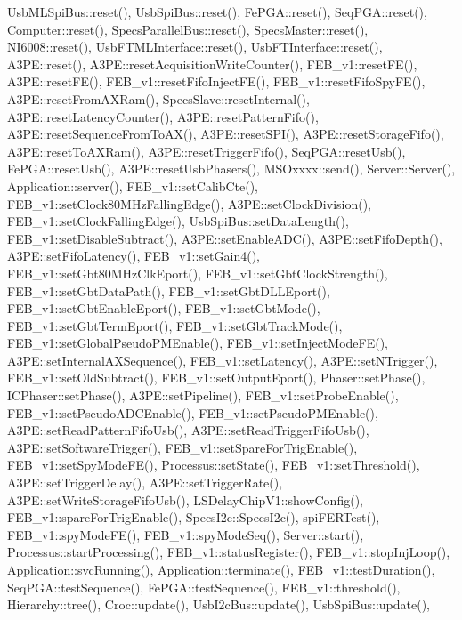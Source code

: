 Usb\+M\+L\+Spi\+Bus\+::reset(), Usb\+Spi\+Bus\+::reset(), Fe\+P\+G\+A\+::reset(), Seq\+P\+G\+A\+::reset(), Computer\+::reset(), Specs\+Parallel\+Bus\+::reset(), Specs\+Master\+::reset(), N\+I6008\+::reset(), Usb\+F\+T\+M\+L\+Interface\+::reset(), Usb\+F\+T\+Interface\+::reset(), A3\+P\+E\+::reset(), A3\+P\+E\+::reset\+Acquisition\+Write\+Counter(), F\+E\+B\+\_\+v1\+::reset\+F\+E(), A3\+P\+E\+::reset\+F\+E(), F\+E\+B\+\_\+v1\+::reset\+Fifo\+Inject\+F\+E(), F\+E\+B\+\_\+v1\+::reset\+Fifo\+Spy\+F\+E(), A3\+P\+E\+::reset\+From\+A\+X\+Ram(), Specs\+Slave\+::reset\+Internal(), A3\+P\+E\+::reset\+Latency\+Counter(), A3\+P\+E\+::reset\+Pattern\+Fifo(), A3\+P\+E\+::reset\+Sequence\+From\+To\+A\+X(), A3\+P\+E\+::reset\+S\+P\+I(), A3\+P\+E\+::reset\+Storage\+Fifo(), A3\+P\+E\+::reset\+To\+A\+X\+Ram(), A3\+P\+E\+::reset\+Trigger\+Fifo(), Seq\+P\+G\+A\+::reset\+Usb(), Fe\+P\+G\+A\+::reset\+Usb(), A3\+P\+E\+::reset\+Usb\+Phasers(), M\+S\+Oxxxx\+::send(), Server\+::\+Server(), Application\+::server(), F\+E\+B\+\_\+v1\+::set\+Calib\+Cte(), F\+E\+B\+\_\+v1\+::set\+Clock80\+M\+Hz\+Falling\+Edge(), A3\+P\+E\+::set\+Clock\+Division(), F\+E\+B\+\_\+v1\+::set\+Clock\+Falling\+Edge(), Usb\+Spi\+Bus\+::set\+Data\+Length(), F\+E\+B\+\_\+v1\+::set\+Disable\+Subtract(), A3\+P\+E\+::set\+Enable\+A\+D\+C(), A3\+P\+E\+::set\+Fifo\+Depth(), A3\+P\+E\+::set\+Fifo\+Latency(), F\+E\+B\+\_\+v1\+::set\+Gain4(), F\+E\+B\+\_\+v1\+::set\+Gbt80\+M\+Hz\+Clk\+Eport(), F\+E\+B\+\_\+v1\+::set\+Gbt\+Clock\+Strength(), F\+E\+B\+\_\+v1\+::set\+Gbt\+Data\+Path(), F\+E\+B\+\_\+v1\+::set\+Gbt\+D\+L\+L\+Eport(), F\+E\+B\+\_\+v1\+::set\+Gbt\+Enable\+Eport(), F\+E\+B\+\_\+v1\+::set\+Gbt\+Mode(), F\+E\+B\+\_\+v1\+::set\+Gbt\+Term\+Eport(), F\+E\+B\+\_\+v1\+::set\+Gbt\+Track\+Mode(), F\+E\+B\+\_\+v1\+::set\+Global\+Pseudo\+P\+M\+Enable(), F\+E\+B\+\_\+v1\+::set\+Inject\+Mode\+F\+E(), A3\+P\+E\+::set\+Internal\+A\+X\+Sequence(), F\+E\+B\+\_\+v1\+::set\+Latency(), A3\+P\+E\+::set\+N\+Trigger(), F\+E\+B\+\_\+v1\+::set\+Old\+Subtract(), F\+E\+B\+\_\+v1\+::set\+Output\+Eport(), Phaser\+::set\+Phase(), I\+C\+Phaser\+::set\+Phase(), A3\+P\+E\+::set\+Pipeline(), F\+E\+B\+\_\+v1\+::set\+Probe\+Enable(), F\+E\+B\+\_\+v1\+::set\+Pseudo\+A\+D\+C\+Enable(), F\+E\+B\+\_\+v1\+::set\+Pseudo\+P\+M\+Enable(), A3\+P\+E\+::set\+Read\+Pattern\+Fifo\+Usb(), A3\+P\+E\+::set\+Read\+Trigger\+Fifo\+Usb(), A3\+P\+E\+::set\+Software\+Trigger(), F\+E\+B\+\_\+v1\+::set\+Spare\+For\+Trig\+Enable(), F\+E\+B\+\_\+v1\+::set\+Spy\+Mode\+F\+E(), Processus\+::set\+State(), F\+E\+B\+\_\+v1\+::set\+Threshold(), A3\+P\+E\+::set\+Trigger\+Delay(), A3\+P\+E\+::set\+Trigger\+Rate(), A3\+P\+E\+::set\+Write\+Storage\+Fifo\+Usb(), L\+S\+Delay\+Chip\+V1\+::show\+Config(), F\+E\+B\+\_\+v1\+::spare\+For\+Trig\+Enable(), Specs\+I2c\+::\+Specs\+I2c(), spi\+F\+E\+R\+Test(), F\+E\+B\+\_\+v1\+::spy\+Mode\+F\+E(), F\+E\+B\+\_\+v1\+::spy\+Mode\+Seq(), Server\+::start(), Processus\+::start\+Processing(), F\+E\+B\+\_\+v1\+::status\+Register(), F\+E\+B\+\_\+v1\+::stop\+Inj\+Loop(), Application\+::svc\+Running(), Application\+::terminate(), F\+E\+B\+\_\+v1\+::test\+Duration(), Seq\+P\+G\+A\+::test\+Sequence(), Fe\+P\+G\+A\+::test\+Sequence(), F\+E\+B\+\_\+v1\+::threshold(), Hierarchy\+::tree(), Croc\+::update(), Usb\+I2c\+Bus\+::update(), Usb\+Spi\+Bus\+::update(), 